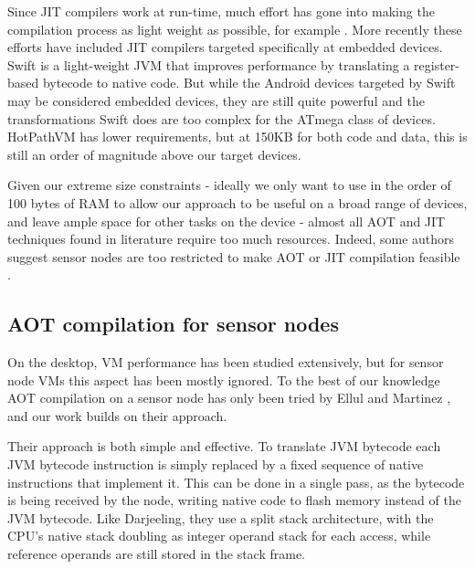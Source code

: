 Since JIT compilers work at run-time, much effort has gone into making the compilation process as light weight as possible, for example \cite{Krall:1998}. More recently these efforts have included JIT compilers targeted specifically at embedded devices. Swift \cite{Zhang:2012wf} is a light-weight JVM that improves performance by translating a register-based bytecode to native code. But while the Android devices targeted by Swift may be considered embedded devices, they are still quite powerful and the transformations Swift does are too complex for the ATmega class of devices. HotPathVM \cite{Gal:2006} has lower requirements, but at 150KB for both code and data, this is still an order of magnitude above our target devices.

Given our extreme size constraints - ideally we only want to use in the order of 100 bytes of RAM to allow our approach to be useful on a broad range of devices, and leave ample space for other tasks on the device - almost all AOT and JIT techniques found in literature require too much resources. Indeed, some authors suggest sensor nodes are too restricted to make AOT or JIT compilation feasible \cite{Aslam:2011thesis, Wirjawan:2008}.

\subsection{AOT compilation for sensor nodes}
On the desktop, VM performance has been studied extensively, but for sensor node VMs this aspect has been mostly ignored. To the best of our knowledge AOT compilation on a sensor node has only been tried by Ellul and Martinez \cite{Ellul:2010iw, Ellul:2012thesis}, and our work builds on their approach.

Their approach is both simple and effective. To translate JVM bytecode each JVM bytecode instruction is simply replaced by a fixed sequence of native instructions that implement it. This can be done in a single pass, as the bytecode is being received by the node, writing native code to flash memory instead of the JVM bytecode. Like Darjeeling, they use a split stack architecture, with the CPU's native stack doubling as integer operand stack for each access, while reference operands are still stored in the stack frame.

